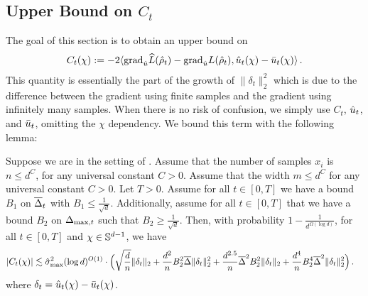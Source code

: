 \subsection{Upper Bound on $C_t$}\label{sec:proof_ct}
The goal of this section is to obtain an upper bound on
\begin{align}
C_t(\chi)
:= -2 \langle {\textup{grad}}_{\hat{u}} \widehat{L}({\hat{\rho}}_t) - {\textup{grad}}_{\hat{u}} L({\hat{\rho}}_t), \hat{u}_t(\chi) - \bar{u}_t(\chi) \rangle \,.
\end{align}
This quantity is essentially the part of the growth of $\|\delta_t\|_2^2$ which is due to the difference between the gradient using finite samples and the gradient using infinitely many samples. When there is no risk of confusion, we simply use $C_t$, $\hat{u}_t$, and $\bar{u}_t$, omitting the $\chi$ dependency.
We bound this term with the following lemma:

\begin{lemma}\label{lemma:ct_bound}
Suppose we are in the setting of . Assume that the number of samples $x_i$ is $n \leq d^C$, for any universal constant $C > 0$. Assume that the width $m \leq d^C$ for any universal constant $C > 0$. Let $T  > 0$. Assume for all $t \in [0, T]$ we have a bound $B_1$ on $\overline{\Delta}_t$ with $B_1 \leq \frac{1}{\sqrt{d}}$. Additionally, assume for all $t \in [0, T]$ that we have a bound $B_2$ on $\Delta_{\textup{max}, t}$ such that $B_2 \geq \frac{1}{\sqrt{d}}$. Then, with probability $1 - \frac{1}{d^{\Omega(\log d)}}$, for all $t \in [0, T]$ and $\chi \in \mathbb{S}^{d - 1}$, we have
\begin{align}
|C_t(\chi)|
& \lesssim \hat{\sigma}_{\textup{max}}^2 (\log d)^{O(1)} \cdot \Big(\sqrt{\frac{d}{n}} \|\delta_t\|_2 + \frac{d^2}{n} B_2^2 \overline{\Delta} \|\delta_t\|_2^2 + \frac{d^{2.5}}{n} \overline{\Delta}^2 B_2^2 \|\delta_t\|_2  + \frac{d^4}{n} B_2^4 \overline{\Delta}^2 \|\delta_t\|_2^2 \Big) \,.
\end{align}
where $\delta_t = \hat{u}_t(\chi) - \bar{u}_t(\chi)$.

\end{lemma}

